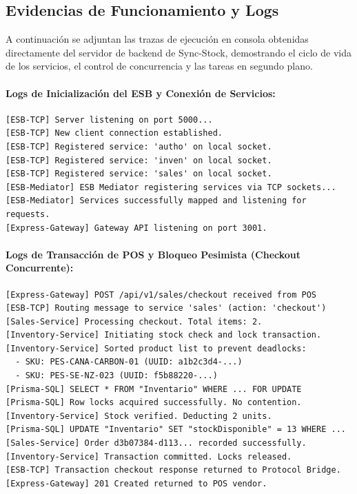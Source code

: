 \documentclass[12pt,a4paper]{article}
\begin{document}
\subsection{Evidencias de Funcionamiento y Logs}

A continuación se adjuntan las trazas de ejecución en consola obtenidas directamente del servidor de backend de Sync-Stock, demostrando el ciclo de vida de los servicios, el control de concurrencia y las tareas en segundo plano.

\paragraph{Logs de Inicialización del ESB y Conexión de Servicios:}
\begin{verbatim}
[ESB-TCP] Server listening on port 5000...
[ESB-TCP] New client connection established.
[ESB-TCP] Registered service: 'autho' on local socket.
[ESB-TCP] Registered service: 'inven' on local socket.
[ESB-TCP] Registered service: 'sales' on local socket.
[ESB-Mediator] ESB Mediator registering services via TCP sockets...
[ESB-Mediator] Services successfully mapped and listening for requests.
[Express-Gateway] Gateway API listening on port 3001.
\end{verbatim}

\paragraph{Logs de Transacción de POS y Bloqueo Pesimista (Checkout Concurrente):}
\begin{verbatim}
[Express-Gateway] POST /api/v1/sales/checkout received from POS
[ESB-TCP] Routing message to service 'sales' (action: 'checkout')
[Sales-Service] Processing checkout. Total items: 2.
[Inventory-Service] Initiating stock check and lock transaction.
[Inventory-Service] Sorted product list to prevent deadlocks:
  - SKU: PES-CANA-CARBON-01 (UUID: a1b2c3d4-...)
  - SKU: PES-SE-NZ-023 (UUID: f5b88220-...)
[Prisma-SQL] SELECT * FROM "Inventario" WHERE ... FOR UPDATE
[Prisma-SQL] Row locks acquired successfully. No contention.
[Inventory-Service] Stock verified. Deducting 2 units.
[Prisma-SQL] UPDATE "Inventario" SET "stockDisponible" = 13 WHERE ...
[Sales-Service] Order d3b07384-d113... recorded successfully.
[Inventory-Service] Transaction committed. Locks released.
[ESB-TCP] Transaction checkout response returned to Protocol Bridge.
[Express-Gateway] 201 Created returned to POS vendor.
\end{verbatim}
\end{document}
